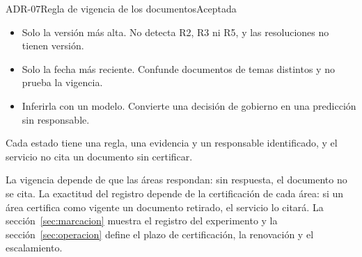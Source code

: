 \begin{adr}{ADR-07}{Regla de vigencia de los documentos}{Aceptada}
\begin{itemize}
  \item Solo la versión más alta. No detecta R2, R3 ni R5, y las resoluciones no tienen versión.
  \item Solo la fecha más reciente. Confunde documentos de temas distintos y no prueba la vigencia.
  \item Inferirla con un modelo. Convierte una decisión de gobierno en una predicción sin responsable.
\end{itemize}

Cada estado tiene una regla, una evidencia y un responsable identificado, y el servicio no cita un documento sin certificar.

La vigencia depende de que las áreas respondan: sin respuesta, el documento no se cita. La exactitud del registro depende de la certificación de cada área: si un área certifica como vigente un documento retirado, el servicio lo citará. La sección~\ref{sec:marcacion} muestra el registro del experimento y la sección~\ref{sec:operacion} define el plazo de certificación, la renovación y el escalamiento.
\end{adr}

